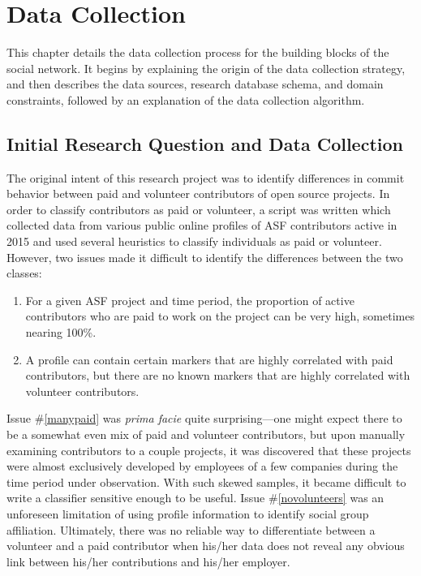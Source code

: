 \chapter{Data Collection}
This chapter details the data collection process for the building blocks of the social network. It begins by explaining the origin of the data collection strategy, and then describes the data sources, research database schema, and domain constraints, followed by an explanation of the data collection algorithm.

\section{Initial Research Question and Data Collection}

The original intent of this research project was to identify differences in commit behavior between paid and volunteer contributors of open source projects. In order to classify contributors as paid or volunteer, a script was written which collected data from various public online profiles of ASF contributors active in 2015 and used several heuristics to classify individuals as paid or volunteer. 
However, two issues made it difficult to identify the differences between the two classes:
\begin{enumerate}
	\item \label{manypaid} For a given ASF project and time period, the proportion of active contributors who are paid to work on the project can be very high, sometimes nearing 100\%.
	\item \label{novolunteers} A profile can contain certain markers that are highly correlated with paid contributors, but there are no known markers that are highly correlated with volunteer contributors.
\end{enumerate}
Issue \#\ref{manypaid} was \emph{prima facie} quite surprising---one might expect there to be a somewhat even mix of paid and volunteer contributors, but upon manually examining contributors to a couple projects, it was discovered that these projects were almost exclusively developed by employees of a few companies during the time period under observation. With such skewed samples, it became difficult to write a classifier sensitive enough to be useful.
Issue \#\ref{novolunteers} was an unforeseen limitation of using profile information to identify social group affiliation. Ultimately, there was no reliable way to differentiate between a volunteer and a paid contributor when his/her data does not reveal any obvious link between his/her contributions and his/her employer.

